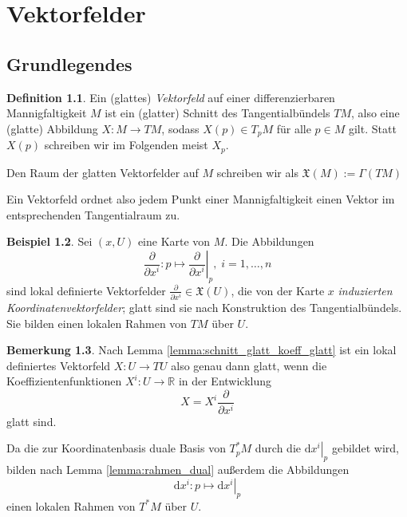 \documentclass[a4paper]{scrreprt}
\numberwithin{equation}{chapter}
\newcommand{\D}{\mathrm{d}}
\newcommand{\R}{\mathbb{R}}
\theoremstyle{definition}
\newtheorem{defn}{Definition}[section]
\newtheorem{bem}[defn]{Bemerkung}
\newtheorem{bsp}[defn]{Beispiel}
\begin{document}
\chapter{Vektorfelder}

\section{Grundlegendes}
\begin{defn}
	Ein (glattes) \emph{Vektorfeld} auf einer differenzierbaren Mannigfaltigkeit $M$ ist ein (glatter) Schnitt des Tangentialbündels $TM$, also eine (glatte) Abbildung $X\colon M \to TM$, sodass $X(p) \in T_pM$ für alle $p\in M$ gilt. Statt $X(p)$ schreiben wir im Folgenden meist $X_p$.

	Den Raum der glatten Vektorfelder auf $M$ schreiben wir als $\mathfrak X(M) := \Gamma(TM)$
\end{defn}
Ein Vektorfeld ordnet also jedem Punkt einer Mannigfaltigkeit einen Vektor im entsprechenden Tangentialraum zu.

\begin{bsp}
	Sei $(x,U)$ eine Karte von $M$. Die Abbildungen
	\[\frac{\partial}{\partial x^i}\colon p \mapsto \left.\frac{\partial}{\partial x^i}\right|_p, \; i = 1,\dots,n\]
	sind lokal definierte Vektorfelder $\frac{\partial}{\partial x^i} \in \mathfrak X(U)$, die von der Karte $x$ \emph{induzierten Koordinatenvektorfelder}; glatt sind sie nach Konstruktion des Tangentialbündels. Sie bilden einen lokalen Rahmen von $TM$ über $U$.
\end{bsp}

\begin{bem}
	Nach Lemma \ref{lemma:schnitt_glatt_koeff_glatt} ist ein lokal definiertes Vektorfeld $X\colon U \to TU$ also genau dann glatt, wenn die Koeffizientenfunktionen $X^i\colon U \to \R$ in der Entwicklung
	\[X = X^i \frac{\partial}{\partial x^i}\]
	glatt sind.

	Da die zur Koordinatenbasis duale Basis von $T_p^*M$ durch die $\left.\D x^i\right|_p$ gebildet wird, bilden nach Lemma \ref{lemma:rahmen_dual} außerdem die Abbildungen
	\[\D x^i\colon p \mapsto \left.\D x^i\right|_p\]
	einen lokalen Rahmen von $T^*M$ über $U$.
\end{bem}
\end{document}
